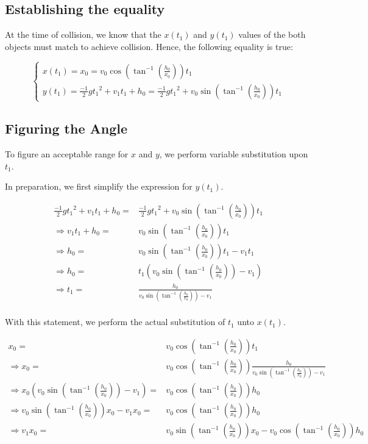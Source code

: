 \documentclass[letterpaper]{article}
\begin{document}
\subsection{Establishing the equality}
\label{sec:orgdce7947}
At the time of collision, we know that the \(x(t_1)\) and \(y(t_1)\) values of the both objects must match to achieve collision. Hence, the following equality is true:

\begin{equation}
    \begin{cases}
        x(t_1) = x_0 = v_0\cos(\tan^{-1}(\frac{h_0}{x_0}))t_1 \\
        y(t_1) = \frac{-1}{2}g{t_1}^2 + v_1t_1 + h_0 = \frac{-1}{2}g {t_1}^2 + v_0\sin(\tan^{-1}(\frac{h_0}{x_0})) t_1
    \end{cases}
\end{equation}


\subsection{Figuring the Angle}
\label{sec:org2e45ae8}
To figure an acceptable range for \(x\) and \(y\), we perform variable substitution upon \(t_1\).

In preparation, we first simplify the expression for \(y(t_1)\).

\begin{align}
    \frac{-1}{2}g{t_1}^2 + v_1t_1 + h_0 =& \frac{-1}{2}g {t_1}^2 + v_0\sin(\tan^{-1}(\frac{h_0}{x_0})) t_1 \\
\Rightarrow v_1t_1 + h_0 =& v_0\sin(\tan^{-1}(\frac{h_0}{x_0})) t_1  \\
\Rightarrow h_0 =& v_0\sin(\tan^{-1}(\frac{h_0}{x_0})) t_1 - v_1t_1  \\
\Rightarrow h_0 =& t_1 (v_0\sin(\tan^{-1}(\frac{h_0}{x_0})) - v_1)  \\
\Rightarrow t_1 =& \frac{h_0}{v_0\sin(\tan^{-1}(\frac{h_0}{x_0})) - v_1}  \\
\end{align}

With this statement, we perform the actual substitution of \(t_1\) unto \(x(t_1)\).

\begin{align}
    x_0 =& v_0\cos(\tan^{-1}(\frac{h_0}{x_0}))t_1 \\   
    \Rightarrow x_0 =& v_0\cos(\tan^{-1}(\frac{h_0}{x_0}))\frac{h_0}{v_0\sin(\tan^{-1}(\frac{h_0}{x_0})) - v_1} \\   
    \Rightarrow x_0 (v_0\sin(\tan^{-1}(\frac{h_0}{x_0})) - v_1) =& v_0\cos(\tan^{-1}(\frac{h_0}{x_0}))h_0\\   
    \Rightarrow v_0\sin(\tan^{-1}(\frac{h_0}{x_0}))x_0 - v_1x_0 =& v_0\cos(\tan^{-1}(\frac{h_0}{x_0}))h_0\\   
    \Rightarrow v_1x_0 =& v_0\sin(\tan^{-1}(\frac{h_0}{x_0}))x_0 - v_0\cos(\tan^{-1}(\frac{h_0}{x_0}))h_0\\
\end{align}
\end{document}
